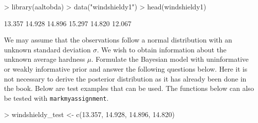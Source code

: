 \documentclass[a4paper,11pt]{article}
\begin{document}
\begin{Schunk}
\begin{Sinput}
> library(aaltobda)
> data("windshieldy1")
> head(windshieldy1)
\end{Sinput}
\begin{Soutput}
[1] 13.357 14.928 14.896 15.297 14.820 12.067
\end{Soutput}
\end{Schunk}

We may assume that the observations follow a normal distribution with an unknown standard deviation $\sigma$. We wish to obtain information about the unknown average hardness $\mu$. Formulate the Bayesian model
with uninformative or weakly informative prior and answer the
following questions below. Here it is not necessary to derive the posterior distribution as it has already been done in the book. Below are test examples that can be used. The functions below can also be tested with \texttt{markmyassignment}. 

\begin{Schunk}
\begin{Sinput}
> windshieldy_test <- c(13.357, 14.928, 14.896, 14.820)
\end{Sinput}
\end{Schunk}

\end{document}
